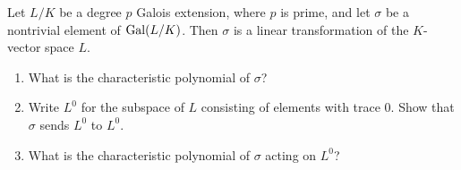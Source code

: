 \begin{question}[subtitle = August 2020 Problem 3,ID=Aug20_3]
Let $L/K$ be a degree $p$ Galois extension, where $p$ is prime, and let $\sigma$ be a nontrivial element of $\operatorname{Gal}(L/K)$. Then $\sigma$ is a linear transformation of the $K$-vector space $L$.
\begin{enumerate}
    \item What is the characteristic polynomial of $\sigma$?
    \item Write $L^0$ for the subspace of $L$ consisting of elements with trace 0. Show that $\sigma$ sends $L^0$ to $L^0$.
    \item What is the characteristic polynomial of $\sigma$ acting on $L^0$?
\end{enumerate}
\end{question}
